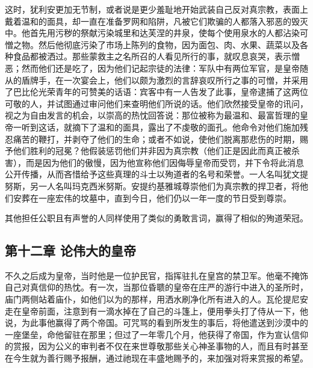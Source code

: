 这时，犹利安更加无节制，或者说是更少羞耻地开始武装自己反对真宗教，表面上戴着温和的面具，却一直在准备罗网和陷阱，凡被它们欺骗的人都落入邪恶的毁灭中。他首先用污秽的祭献污染城里和达芙涅的井泉，使每个使用泉水的人都沾染可憎之物。然后他彻底污染了市场上陈列的食物，因为面包、肉、水果、蔬菜以及各种食品都被洒过。那些蒙救主之名所召的人看见所行的事，就叹息哀哭，表示憎恶；然而他们还是吃了，因为他们记起宗徒的法律：军队中有两位军官，是皇帝随从的盾牌手，在一次宴会上，他们以颇为激烈的言辞哀叹所行之事的可憎，并采用了巴比伦光荣青年的可赞美的话语：宾客中有一人告发了此事，皇帝逮捕了这两位可敬的人，并试图通过审问他们来查明他们所说的话。他们欣然接受皇帝的讯问，视之为自由发言的机会，以崇高的热忱回答说：那位被称为最温和、最富哲理的皇帝一听到这话，就摘下了温和的面具，露出了不虔敬的面孔。他命令对他们施加残忍痛苦的鞭打，并剥夺了他们的生命；或者不如说，使他们脱离那悲伤的时期，赐予他们胜利的冠冕？他假装惩罚他们并非因为真宗教（他们正是因此而真正被杀害），而是因为他们的傲慢，因为他宣称他们因侮辱皇帝而受罚，并下令将此消息公开传播，从而吝惜给予这些真理的斗士以殉道者的名号和荣誉。一人名叫犹文提努斯，另一人名叫玛克西米努斯。安提约基雅城尊崇他们为真宗教的捍卫者，将他们安葬在一座宏伟的坟墓中，直到今日，他们仍以一年一度的节日受到尊崇。\par

其他担任公职且有声誉的人同样使用了类似的勇敢言词，赢得了相似的殉道荣冠。\par


\subsection{第十二章 论伟大的皇帝}

不久之后成为皇帝，当时他是一位护民官，指挥驻扎在皇宫的禁卫军。他毫不掩饰自己对真信仰的热忱。有一次，当那位昏聩的皇帝在庄严的游行中进入的圣所时，庙门两侧站着庙仆，如他们以为的那样，用洒水刷净化所有进入的人。瓦伦提尼安走在皇帝前面，注意到有一滴水掉在了自己的斗篷上，便用拳头打了侍从一下，他说，为此事他赢得了两个帝国。可咒骂的看到所发生的事后，将他遣送到沙漠中的一座堡垒，命他留驻在那里；但过了一年零几个月，他获得了帝国，作为宣认信仰的赏报，因为公义的审判者不仅在来世尊敬那些关心神圣事物的人，而且有时甚至在今生就为善行赐予报酬，通过祂现在丰盛地赐予的，来加强对将来赏报的希望。\par

